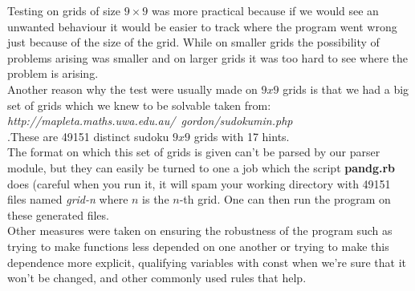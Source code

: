 \documentclass[english,a4paper]{article}
\begin{document}
Testing on grids of size $9\times 9$ was more practical because if we
would see an unwanted behaviour it would be easier to track where the
program went wrong just because of the size of the grid. While on
smaller grids the possibility of problems arising was smaller and on
larger grids it was too hard to see where the problem is arising.\\

Another reason why the test were usually made on $9x9$ grids is that
we had a big set of grids which we knew to be solvable taken from:\\
\emph{http://mapleta.maths.uwa.edu.au/~gordon/sudokumin.php}\\
.These are 49151 distinct sudoku $9x9$ grids with 17 hints.\\

The format on which this set of grids is given can't be parsed by our
parser module, but they can easily be turned to one a job which the
script \textbf{pandg.rb} does (careful when you run it, it will spam
your working directory with 49151 files named \emph{grid-n} where $n$
is the $n$-th grid. One can then run the program on these generated
files.\\

Other measures were taken on ensuring the robustness of the program
such as trying to make functions less depended on one another or
trying to make this dependence more explicit, qualifying variables
with const when we're sure that it won't be changed, and other
commonly used rules that help. 
\end{document}
